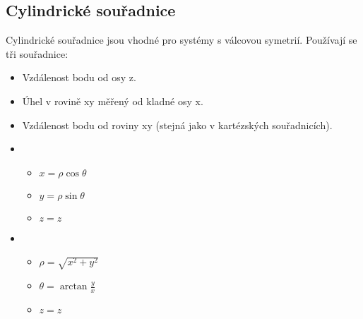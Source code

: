 \documentclass[letterpaper,10pt,english]{jupyterBook}
\begin{document}
\subsection{Cylindrické souřadnice}
\label{\detokenize{Prednasky/0_3_Sou_u0159adnicov_xe9_syst_xe9my:cylindricke-souradnice}}
\sphinxAtStartPar
Cylindrické souřadnice jsou vhodné pro systémy s válcovou symetrií. Používají se tři souřadnice:
\begin{itemize}
\item {} 
\sphinxAtStartPar
{} Vzdálenost bodu od osy z.

\item {} 
\sphinxAtStartPar
{} Úhel v rovině xy měřený od kladné osy x.

\item {} 
\sphinxAtStartPar
{} Vzdálenost bodu od roviny xy (stejná jako v kartézských souřadnicích).

\end{itemize}

\sphinxAtStartPar
{}

\sphinxAtStartPar
{}
\begin{itemize}
\item {} 
\sphinxAtStartPar
{}
\begin{itemize}
\item {} 
\sphinxAtStartPar
\(x = \rho \cos{\theta}\)

\item {} 
\sphinxAtStartPar
\(y = \rho \sin{\theta}\)

\item {} 
\sphinxAtStartPar
\(z = z\)

\end{itemize}

\item {} 
\sphinxAtStartPar
{}
\begin{itemize}
\item {} 
\sphinxAtStartPar
\(\rho = \sqrt{x^2 + y^2}\)

\item {} 
\sphinxAtStartPar
\(\theta = \arctan{\frac{y}{x}}\)

\item {} 
\sphinxAtStartPar
\(z = z\)

\end{itemize}

\end{itemize}
\end{document}
